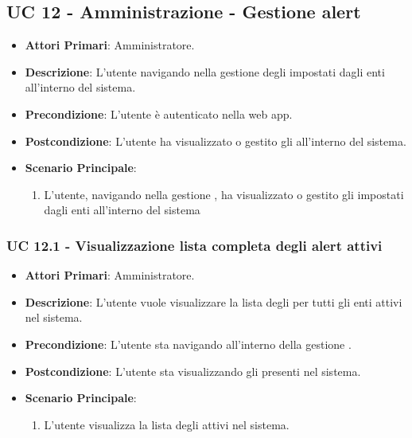 	\subsection{UC 12 - Amministrazione - Gestione alert}

		\begin{itemize}
			\item \textbf{Attori Primari}: Amministratore.
			\item \textbf{Descrizione}: L'utente navigando nella gestione degli  impostati dagli enti all'interno del sistema.
			\item \textbf{Precondizione}: L'utente è autenticato nella web app.
			\item \textbf{Postcondizione}: L'utente ha visualizzato o gestito gli  all'interno del sistema.
			\item \textbf{Scenario Principale}:
			\begin{enumerate}
				\item{L'utente, navigando nella gestione , ha visualizzato o gestito gli  impostati dagli enti all'interno del sistema}
			\end{enumerate}	
		\end{itemize}

		\subsubsection{UC 12.1 - Visualizzazione lista completa degli alert attivi}
		\begin{itemize}
			\item \textbf{Attori Primari}: Amministratore.
			\item \textbf{Descrizione}: L'utente vuole visualizzare la lista degli  per tutti gli enti attivi nel sistema.
			\item \textbf{Precondizione}: L'utente sta navigando all'interno della gestione .
			\item \textbf{Postcondizione}: L'utente sta visualizzando gli  presenti nel sistema.
			\item \textbf{Scenario Principale}:
			\begin{enumerate}
				\item{L'utente visualizza la lista degli  attivi nel sistema.}
			\end{enumerate}	
		\end{itemize}

